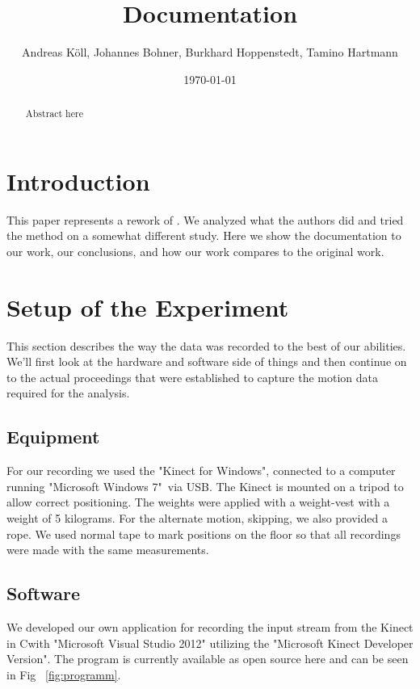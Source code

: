 \documentclass[a4paper]{article}
\newcommand{\CS}{C\nolinebreak\hspace{-.05em}\raisebox{.6ex}{\scriptsize\bf \#\ }}
\begin{document}
\title{Documentation}
\author{Andreas Köll, Johannes Bohner, Burkhard Hoppenstedt, Tamino Hartmann}
\date{\today}

\maketitle

\begin{abstract}

Abstract here
\end{abstract}
\newpage

\section{Introduction}

This paper represents a rework of \cite{origin}.
We analyzed what the authors did and tried the method on a somewhat different study.
Here we show the documentation to our work, our conclusions, and how our work compares to the original work.

\section{Setup of the Experiment}

This section describes the way the data was recorded to the best of our abilities.
We'll first look at the hardware and software side of things and then continue on to the actual proceedings that were established to capture the motion data required for the analysis.

\subsection{Equipment}

For our recording we used the "Kinect for Windows"\texttrademark \cite{kinect}, connected to a computer running "Microsoft Windows 7"\textregistered \ via USB.
The Kinect is mounted on a tripod to allow correct positioning.
The weights were applied with a weight-vest with a weight of 5 kilograms.
For the alternate motion, skipping, we also provided a rope.
We used normal tape to mark positions on the floor so that all recordings were made with the same measurements.

\subsection{Software}

We developed our own application for recording the input stream from the Kinect in \CS with "Microsoft Visual Studio 2012" utilizing the "Microsoft Kinect Developer Version".
The program is currently available as open source here \cite{csprogram} and can be seen in Fig ~\ref{fig:programm}.
\end{document}

